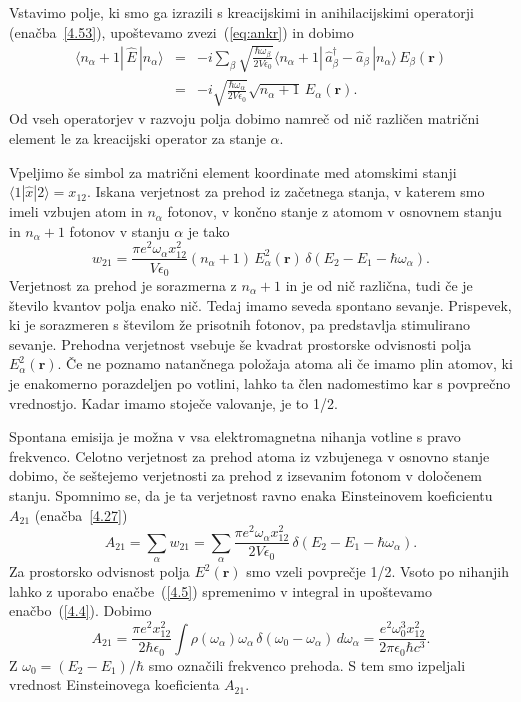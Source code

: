 Vstavimo polje, ki smo ga izrazili s kreacijskimi in anihilacijskimi operatorji (enačba~\ref{4.53}),
upoštevamo zvezi~(\ref{eq:ankr}) in dobimo
\begin{eqnarray}
\langle n_{\alpha}+1|\, \hat{E}\,|n_{\alpha}\rangle & = 
& -i\sum_{\beta}\sqrt{\frac{\hbar\omega_{\beta}}{2V\epsilon_{0}}}
\langle n_{\alpha}+1|\,\hat{a}_{\beta}^{\dagger}-\hat{a}_{\beta}\,|n_{\alpha}\rangle\, 
E_{\beta}(\mathbf{r})\nonumber \\
 & = & -i\sqrt{\frac{\hbar\omega_{\alpha}}{2V\epsilon_{0}}}
 \sqrt{n_{\alpha}+1}\, E_{\alpha}(\mathbf{r}).
\end{eqnarray}
Od vseh operatorjev v razvoju polja dobimo namreč od nič različen matrični
element le za kreacijski operator za stanje $\alpha$.


Vpeljimo še simbol za matrični element koordinate med 
atomskimi stanji $\langle1|\hat{x}|2\rangle=x_{12}$. Iskana verjetnost za prehod iz 
začetnega stanja, v katerem smo imeli vzbujen atom in $n_{\alpha}$ fotonov, v končno
stanje z atomom v osnovnem stanju in $n_{\alpha}+1$ fotonov v stanju $\alpha$ je tako
\begin{equation}
w_{21}=\frac{\pi e^{2}\omega_{\alpha}x_{12}^{2}}{V\epsilon_{0}}
(n_{\alpha}+1)\,E_{\alpha}^{2}(\mathbf{r})\,\delta(E_{2}-E_{1}-\hbar\omega_{\alpha}).
\label{4.56}
\end{equation}
Verjetnost za prehod je sorazmerna z $n_{\alpha}+1$ in je od nič
različna, tudi če je število kvantov polja enako nič. Tedaj imamo seveda
spontano sevanje. Prispevek, ki je 
sorazmeren s številom že prisotnih fotonov, pa predstavlja stimulirano 
sevanje. Prehodna verjetnost vsebuje
še kvadrat prostorske odvisnosti polja $E_{\alpha}^{2}(\mathbf{r})$.
Če ne poznamo natančnega položaja atoma ali če imamo plin atomov, ki je enakomerno
porazdeljen po votlini, lahko ta člen nadomestimo kar s povprečno vrednostjo.
Kadar imamo stoječe valovanje, je to 1/2.


Spontana emisija je možna v vsa elektromagnetna nihanja votline s
pravo frekvenco. Celotno verjetnost za prehod atoma iz vzbujenega
v osnovno stanje dobimo, če seštejemo verjetnosti za prehod z izsevanim fotonom 
v določenem stanju. Spomnimo se, da je ta verjetnost ravno enaka 
Einsteinovem koeficientu $A_{21}$ (enačba~\ref{4.27})
\begin{equation}
A_{21}=\sum_{\alpha}w_{21}=\sum_{\alpha}\frac{\pi 
e^{2}\omega_{\alpha}x_{12}^{2}}{2V\epsilon_{0}}\,\delta(E_{2}-E_{1}-\hbar\omega_{\alpha}).
\label{4.57}
\end{equation}
Za prostorsko odvisnost polja $E^{2}(\mathbf{r})$ smo vzeli povprečje
1/2. Vsoto po nihanjih lahko z uporabo enačbe~(\ref{4.5}) spremenimo v integral
in upoštevamo enačbo~(\ref{4.4}). Dobimo
\begin{equation}
A_{21}=\frac{\pi e^{2}x_{12}^{2}}{2\hbar\epsilon_{0}}\int\rho(\omega_{\alpha})\omega_\alpha\, 
\delta(\omega_{0}-\omega_{\alpha})\, d\omega_{\alpha}=\frac{e^{2}\omega_{0}^{3}x_{12}^{2}}{2\pi\epsilon_{0}\hbar c^{3}}.
\label{4.58}
\end{equation}
 Z $\omega_{0}=(E_{2}-E_{1})/\hbar$ smo označili frekvenco prehoda. S tem smo 
 izpeljali vrednost Einsteinovega koeficienta $A_{21}$. 
 

